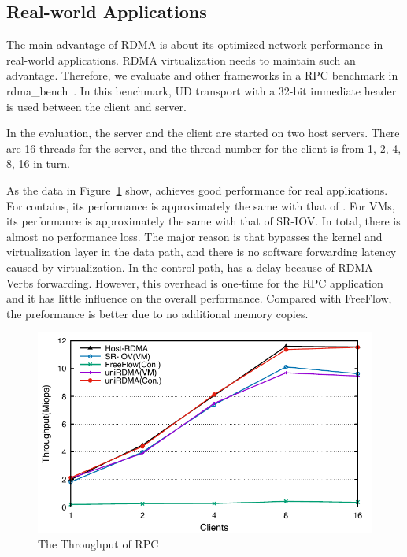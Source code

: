 \subsection{Real-world Applications}

The main advantage of RDMA is about its optimized network performance in real-world applications. RDMA virtualization needs to maintain such an advantage. Therefore, we evaluate \sys and other frameworks in a RPC benchmark in rdma\_bench~\cite{rbench}. In this benchmark, UD transport with a 32-bit immediate header is used between the client and server.

In the evaluation, the server and the client are started on two host servers. There are 16 threads for the server, and the thread number for the client is from 1, 2, 4, 8, 16 in turn. %

As the data in Figure~\ref{fig:rpc} show, \sys achieves good performance for real applications. For contains, its performance is approximately the same with that of \native. For VMs, its performance is approximately the same with that of SR-IOV. In total, there is almost no performance loss. The major reason is that \sys bypasses the kernel and virtualization layer in the data path, and there is no software forwarding latency caused by virtualization. In the control path, \sys has a delay because of RDMA Verbs forwarding. However, this overhead is one-time for the RPC application and it has little influence on the overall performance. Compared with FreeFlow, the preformance \sys is better due to no additional memory copies. 

\begin{figure}[!ht]
	\centering
	\includegraphics[width=1.0\linewidth]{images/rpc.pdf}
	\caption{The Throughput of RPC}
	\label{fig:rpc}
\end{figure}


